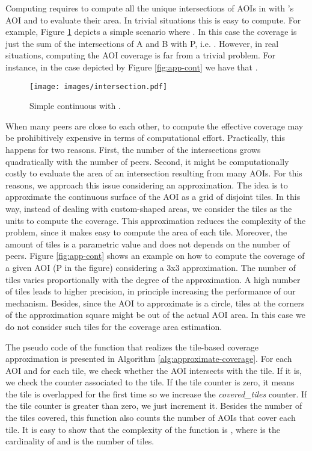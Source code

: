 \documentclass[final,10pt,a5paper]{phdimt}
\theoremstyle{definition}
\begin{document}
Computing  requires to compute all the unique intersections of AOIs in  with 's AOI and to evaluate their area.
In trivial situations this is easy to compute. For example, Figure \ref{fig:simple} depicts a simple scenario where .
In this case the coverage is just the sum of the intersections of A and B with P, i.e. . 
However, in real situations, computing the AOI coverage is far from a trivial problem.
For instance, in the case depicted by Figure \ref{fig:app-cont} we have that .


\begin{figure}[tbh]
\centering
\texttt{[image: images/intersection.pdf]}
\caption{Simple continuous  with .}
\label{fig:simple}
\end{figure}


When many peers are close to each other, to compute the effective coverage may be prohibitively expensive in terms of computational effort. Practically, this happens for two reasons. First, the number of the intersections grows quadratically with the number of peers. Second, it might be computationally costly to evaluate the area of an intersection resulting from many AOIs. 
For this reasons, we approach this issue considering an approximation.
The idea is to approximate the continuous surface of the AOI as a grid of disjoint tiles. In this way, instead of dealing with custom-shaped areas, we consider the tiles as the units to compute the coverage. This approximation reduces the complexity of the problem, since it makes easy to compute the area of each tile.
Moreover, the amount of tiles is a parametric value and does not depends on the number of peers.
Figure \ref{fig:app-cont} shows an example on how to compute the coverage of a given AOI (P in the figure) considering a 3x3 approximation.
The number of tiles varies proportionally with the degree of the approximation. A high number of tiles leads to higher precision, in principle increasing the performance of our mechanism. Besides, since the AOI to approximate is a circle, tiles at the corners of the approximation square might be out of the actual AOI area. In this case we do not consider such tiles for the coverage area estimation.


The pseudo code of the function  that realizes the tile-based coverage approximation is presented in Algorithm \ref{alg:approximate-coverage}. For each AOI  and for each tile, we check whether the AOI intersects with the tile. If it is, we check the counter associated to the tile. If the tile counter is zero, it means the tile is overlapped for the first time so we increase the \textit{covered\_tiles} counter. If the tile counter is greater than zero, we just increment it. Besides the number of the tiles covered, this function also counts the number of AOIs that cover each tile. It is easy to show that the complexity of the function is , where  is the cardinality of  and  is the number of tiles.
\end{document}
